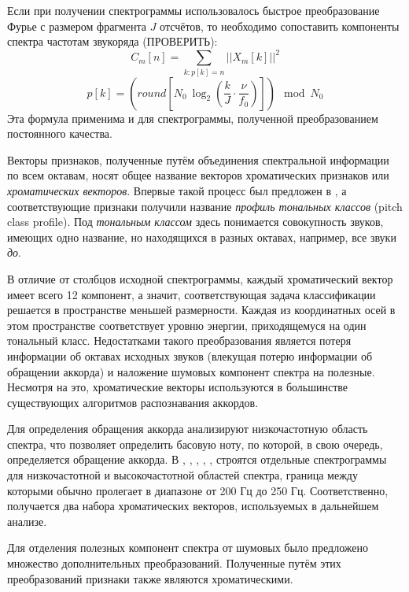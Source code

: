 Если при получении спектрограммы использовалось быстрое преобразование Фурье с
размером фрагмента $J$ отсчётов, то необходимо сопоставить компоненты спектра
частотам звукоряда (ПРОВЕРИТЬ):
\begin{equation}
C_m[n] = \sum_{k: p[k]=n} ||X_m[k]||^2 \label{fft_wrap}
\end{equation}
$$p[k] = \left(round \left[ N_0~\log_2 \left( \frac{k}{J} \cdot \frac{\nu}{f_0}
\right) \right] \right) \mod N_0$$
Эта формула применима и для спектрограммы, полученной преобразованием
постоянного качества.

Векторы признаков, полученные путём объединения спектральной информации по всем
октавам, носят общее название векторов хроматических признаков или
\emph{хроматических векторов}. Впервые такой процесс был предложен в
\cite{Fujishima1999}, а соответствующие признаки получили название
\emph{профиль тональных классов} (pitch class profile). Под \emph{тональным
классом} здесь понимается совокупность звуков, имеющих одно название, но
находящихся в разных октавах, например, все звуки \emph{до}.

В отличие от столбцов исходной спектрограммы, каждый хроматический вектор имеет
всего 12 компонент, а значит, соответствующая задача классификации решается в
пространстве меньшей размерности. Каждая из координатных осей в этом
пространстве соответствует уровню энергии, приходящемуся на один тональный
класс. Недостатками такого преобразования является потеря информации об октавах
исходных звуков (влекущая потерю информации об обращении аккорда) и наложение
шумовых компонент спектра на полезные. Несмотря на это, хроматические векторы
используются в большинстве существующих алгоритмов распознавания аккордов.

Для определения обращения аккорда анализируют низкочастотную область спектра,
что позволяет определить басовую ноту, по которой, в свою очередь, определяется
обращение аккорда. В \cite{Mauch2008}, \cite{Mauch2009}, \cite{Khadkevich2011},
\cite{Ni2011}, \cite{DeHaas2012}, \cite{Chen2012} строятся отдельные
спектрограммы для низкочастотной и высокочастотной областей спектра, граница
между которыми обычно пролегает в диапазоне от 200 Гц до 250 Гц.
Соответственно, получается два набора хроматических векторов, используемых в
дальнейшем анализе. 

Для отделения полезных компонент спектра от шумовых было предложено множество
дополнительных преобразований. Полученные путём этих преобразований признаки
также являются хроматическими.

